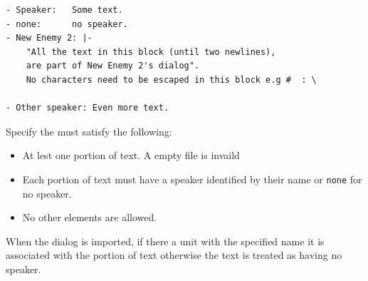 \begin{lstlisting}[caption=A example show the features of the dialog's data format]
- Speaker:   Some text.
- none:      no speaker.
- New Enemy 2: |-
    "All the text in this block (until two newlines),
    are part of New Enemy 2's dialog". 
    No characters need to be escaped in this block e.g #  : \

- Other speaker: Even more text.
\end{lstlisting}
Specify the must satisfy the following:
\begin{itemize}
	\item  At lest one portion of text. A empty file is invaild
	\item  Each portion of text must have a speaker identified by their name or \texttt{none} for no speaker.
	\item  No other elements are allowed.
\end{itemize}

When the dialog is imported, if there a unit with  the specified name it is associated with the  portion of text otherwise the text is treated as having no speaker.
